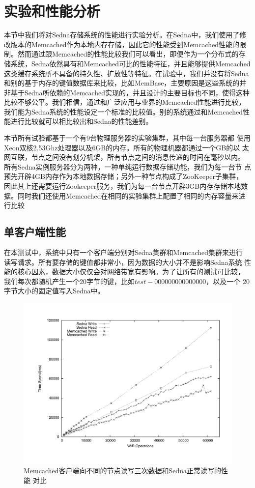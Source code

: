 \section{实验和性能分析}
\label{section:exp3}

本节中我们将对Sedna存储系统的性能进行实验分析。在Sedna中，我们使用了修改版本的Memcached作为本地内存存储，因此它的性能受到Memcached性能的限制。然而通过跟Memcached的性能比较我们可以看出，即便作为一个分布式的存储系统，Sedna依然具有和Memcached可比的性能特征，并且能够提供Memcached这类缓存系统所不具备的持久性、扩放性等特征。在试验中，我们并没有将Sedna和别的基于内存的键值数据库来比较，比如MemBase\cite{membase}，主要原因是这些系统的并非基于Sedna所依赖的Memcached实现的，并且设计的主要目标也不同，使得这种比较不够公平。我们相信，通过和广泛应用与业界的Memcached性能进行比较，我们能为Sedna系统的性能设定一个标准的比较值。别的系统通过和Memcached性能进行比较就可以相比较出和Sedna的性能差别。

本节所有试验都基于一个有9台物理服务器的实验集群，其中每一台服务器都
使用Xeon双核2.53Ghz处理器以及6GB的内存。所有的物理机器都通过一个GB的以
太网互联，节点之间没有划分机架，所有节点之间的消息传递的时间在毫秒以内。
所有Sedna实例服务器分为两种，一种单纯运行数据存储功能，我们为每一台节
点预先开辟4GB内存作为本地数据存储；另外一种节点构成了ZooKeeper子集群，
因此其上还需要运行Zookeeper服务，我们为每一台节点开辟3GB内存存储本地数
据。同时我们还使用Memcached在相同的实验集群上配置了相同的内存容量来进
行比较

\subsection{单客户端性能}

在本测试中，系统中只有一个客户端分别对Sedna集群和Memcached集群来进行
读写请求。所有要存储的键值都非常小，因为数据的大小并不是影响Sedna系统
性能的核心因素，数据大小仅仅会对网络带宽有影响。为了让所有的测试可比较，
我们每次都随机产生一个20字节的键，比如$test-000000000000000$，以及一个
20字节大小的固定值写入Sedna中。

\begin{figure}[h!]
  \centering
\includegraphics[width=5in]{../figures/compare_one_client_memcached_three.pdf}
\caption{Memcached客户端向不同的节点读写三次数据和Sedna正常读写的性能
  对比}
\label{fig:cp1}
\end{figure}


